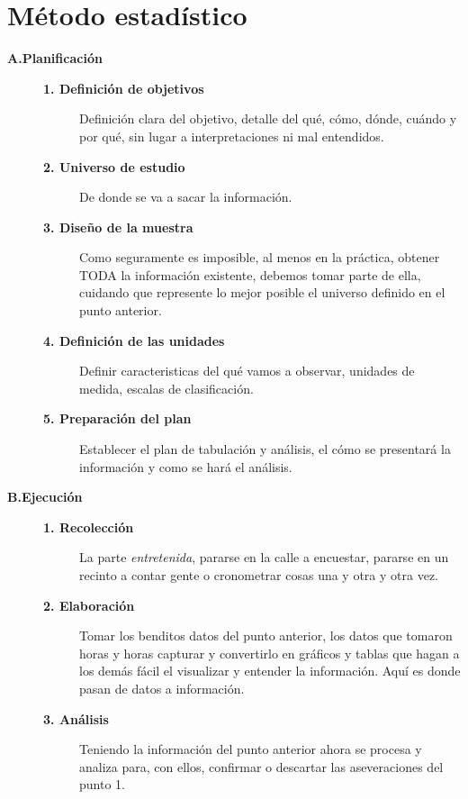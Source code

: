 \documentclass[letterpaper,10pt,openany,oneside]{sphinxmanual}
\begin{document}
\section{Método estadístico}
\label{Estadistica:metodo-estadistico}\begin{description}
\item[{\textbf{A.Planificación}}] \leavevmode\begin{description}
\item[{\textbf{1. Definición de objetivos}}] \leavevmode
Definición clara del objetivo, detalle del qué, cómo, dónde, cuándo y por qué, sin
lugar a interpretaciones ni mal entendidos.

\item[{\textbf{2. Universo de estudio}}] \leavevmode
De donde se va a sacar la información.

\item[{\textbf{3. Diseño de la muestra}}] \leavevmode
Como seguramente es imposible, al menos en la práctica, obtener TODA la información
existente, debemos tomar parte de ella, cuidando que represente lo mejor posible el
universo definido en el punto anterior.

\item[{\textbf{4. Definición de las unidades}}] \leavevmode
Definir caracteristicas del qué vamos a observar, unidades de medida, escalas de
clasificación.

\item[{\textbf{5. Preparación del plan}}] \leavevmode
Establecer el plan de tabulación y análisis, el cómo se presentará la información y
como se hará el análisis.

\end{description}

\item[{\textbf{B.Ejecución}}] \leavevmode\begin{description}
\item[{\textbf{1. Recolección}}] \leavevmode
La parte \emph{entretenida}, pararse en la calle a encuestar, pararse en un recinto a
contar gente o cronometrar cosas una y otra y otra vez.

\item[{\textbf{2. Elaboración}}] \leavevmode
Tomar los benditos datos del punto anterior, los datos que tomaron horas y horas
capturar y convertirlo en gráficos y tablas que hagan a los demás fácil el visualizar
y entender la información. Aquí es donde pasan de datos a información.

\item[{\textbf{3. Análisis}}] \leavevmode
Teniendo la información del punto anterior ahora se procesa y analiza para, con ellos,
confirmar o descartar las aseveraciones del punto 1.

\end{description}

\end{description}
\end{document}

